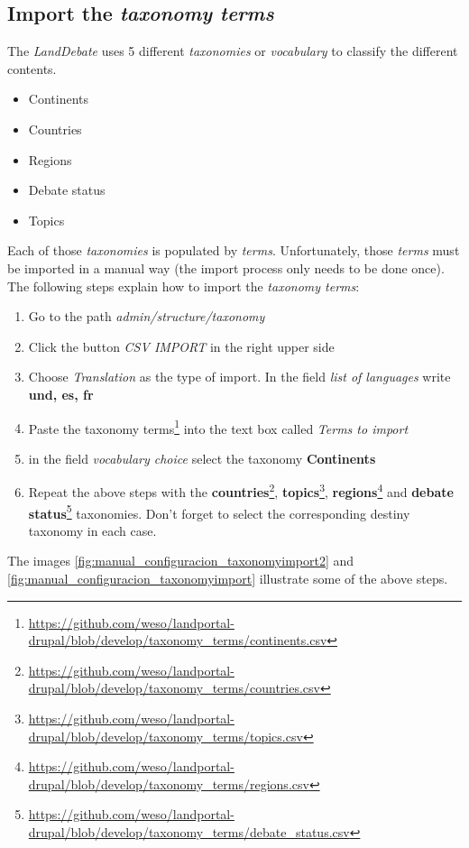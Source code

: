 \subsection{Import the \textit{taxonomy terms}}
The \textit{LandDebate} uses 5 different \textit{taxonomies} or \textit{vocabulary} to classify the different contents.
\begin{itemize}
	\item Continents
	\item Countries
	\item Regions
	\item Debate status
	\item Topics
\end{itemize}
Each of those \textit{taxonomies} is populated by \textit{terms}.  Unfortunately, those \textit{terms} must be imported in a manual way (the import process only needs to be done once).  The following steps explain how to import the \textit{taxonomy terms}:
\begin{enumerate}
	\item Go to the path \textit{admin/structure/taxonomy}
	\item Click the button \textit{CSV IMPORT} in the right upper side
	\item Choose \textit{Translation} as the type of import.  In the field \textit{list of languages} write \textbf{und, es, fr}
	\item Paste the taxonomy terms\footnote{\url{https://github.com/weso/landportal-drupal/blob/develop/taxonomy_terms/continents.csv}} into the text box called \textit{Terms to import}
	\item in the field \textit{vocabulary choice} select the taxonomy \textbf{Continents}
	\item Repeat the above steps with the \textbf{countries}\footnote{\url{https://github.com/weso/landportal-drupal/blob/develop/taxonomy_terms/countries.csv}}, \textbf{topics}\footnote{\url{https://github.com/weso/landportal-drupal/blob/develop/taxonomy_terms/topics.csv}}, \textbf{regions}\footnote{\url{https://github.com/weso/landportal-drupal/blob/develop/taxonomy_terms/regions.csv}} and \textbf{debate status}\footnote{\url{https://github.com/weso/landportal-drupal/blob/develop/taxonomy_terms/debate_status.csv}} taxonomies.  Don't forget to select the corresponding destiny taxonomy in each case.
\end{enumerate}

The images \ref{fig:manual_configuracion_taxonomyimport2} and \ref{fig:manual_configuracion_taxonomyimport} illustrate some of the above steps.

